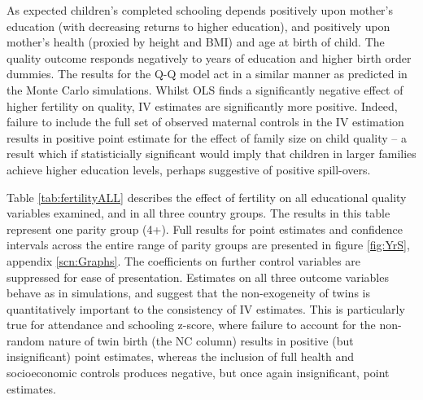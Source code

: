 \documentclass{article}[11pt,subeqn]
\begin{document}
\begin{spacing}{1.5}

As expected children's completed schooling depends positively upon mother's education (with decreasing returns to higher education), 
and positively upon mother's health (proxied by height and BMI) and age at birth of child.  The quality outcome responds negatively to 
years of education and higher birth order dummies.  The results for the Q-Q model act in a similar manner as predicted in the Monte
Carlo simulations.  Whilst OLS finds a significantly negative effect of higher fertility on quality, IV estimates are significantly
more positive.  Indeed, failure to include the full set of observed maternal controls in the IV estimation results in positive point estimate
for the effect of family size on child quality -- a result which if statisticially significant would imply that children in larger families achieve  
higher education levels, perhaps suggestive of positive spill-overs. 


Table \ref{tab:fertilityALL} describes the effect of fertility on all educational quality variables examined, and in all three country groups.  The results in this table represent one parity group (4+).  Full results for point estimates and confidence intervals across the entire range of parity groups are presented in figure \ref{fig:YrS}, appendix \ref{scn:Graphs}. The coefficients on further control variables are suppressed for ease of presentation. Estimates on all three outcome variables behave as in simulations, and suggest that the non-exogeneity of twins is quantitatively important to the consistency of IV estimates.  This is particularly true for attendance and schooling z-score, where failure to account for the non-random nature of twin birth (the NC column) results in positive (but insignificant) point estimates, whereas the inclusion of full health and socioeconomic controls produces negative, but once again insignificant, point estimates.


\end{spacing}
\end{document}
